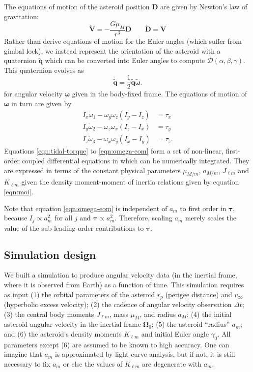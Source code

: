 \documentclass[fleqn,usenatbib]{mnras}
\newcommand{\quat}[1]{\widetilde{\bm{#1}}}
\begin{document}
The equations of motion of the asteroid position $\bm D$ are given by Newton's law of gravitation:
\begin{equation}
  \dot{\bm V} = -\frac{G \mu_M}{r^3} \bm D \qquad \dot{\bm D} = \bm V
  \label{eqn:pos-eom}
\end{equation}
Rather than derive equations of motion for the Euler angles (which suffer from gimbal lock), we instead represent the orientation of the asteroid with a quaternion $\quat q$ which can be converted into Euler angles to compute $\mathcal{D}(\alpha, \beta, \gamma)$. This quaternion evolves as 
\begin{equation}
  \dot{\quat q} = \frac{1}{2}\quat q\quat \omega.
  \label{eqn:quat-eom}
\end{equation}
for angular velocity $\bm \omega$ given in the body-fixed frame. The equations of motion of $\bm \omega$ in turn are given by
\begin{equation}
  \begin{split}
    I_x \dot \omega_1 - \omega_y \omega_z (I_y - I_z) &= \tau_x\\
    I_y \dot \omega_2 - \omega_z \omega_x (I_z - I_x) &= \tau_y\\
    I_z \dot \omega_3 - \omega_x \omega_y (I_x - I_y) &= \tau_z.
  \end{split}
  \label{eqn:omega-eom}
\end{equation}
Equations \ref{eqn:tidal-torque} to \ref{eqn:omega-eom} form a set of non-linear, first-order coupled differential equations in which can be numerically integrated. They are expressed in terms of the constant physical parameters $\mu_{M/m}$, $a_{M/m}$, $J_{\ell m}$ and $K_{\ell m}$ given the density moment-moment of inertia relations given by equation \ref{eqn:moi}.

Note that equation \ref{eqn:omega-eom} is independent of $a_m$ to first order in $\bm \tau$, because $I_{j} \propto a_m^2$ for all $j$ and $\bm \tau \propto a_m^2$. Therefore, scaling $a_m$ merely scales the value of the sub-leading-order contributions to $\bm \tau$.


\subsection{Simulation design}
\label{sec:sim}

We built a simulation to produce angular velocity data (in the inertial frame, where it is observed from Earth) as a function of time. This simulation requires as input (1) the orbital parameters of the asteroid $r_p$ (perigee distance) and $v_\infty$ (hyperbolic excess velocity); (2) the cadence of angular velocity observation $\Delta t$; (3) the central body moments $J_{\ell m}$, mass $\mu_M$, and radius $a_M$; (4) the initial asteroid angular velocity in the inertial frame $\bm \Omega_0$; (5) the asteroid ``radius'' $a_m$; and (6) the asteroid's density moments $K_{\ell m}$ and initial Euler angle $\gamma_0$. All parameters except (6) are assumed to be known to high accuracy. One can imagine that $a_m$ is approximated by light-curve analysis, but if not, it is still necessary to fix $a_m$ or else the values of $K_{\ell m}$ are degenerate with $a_m$.
\end{document}
